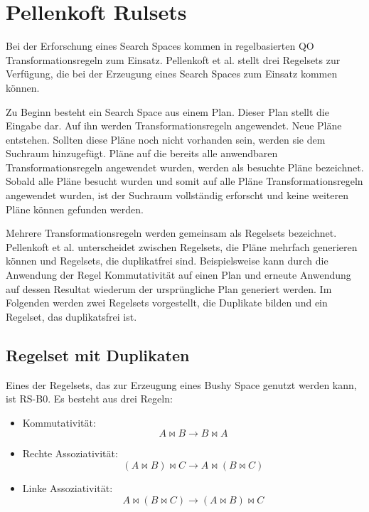 \section{Pellenkoft Rulsets}

Bei der Erforschung eines Search Spaces kommen in regelbasierten \ac{QO} Transformationsregeln zum Einsatz. Pellenkoft et al. \cite{pellenkoft1997duplicate} \cite{manegold2000multi} \cite{pellenkoft1997complexity} stellt drei Regelsets zur Verfügung, die bei der Erzeugung eines Search Spaces zum Einsatz kommen können.



Zu Beginn besteht ein Search Space aus einem Plan. Dieser Plan stellt die Eingabe dar. Auf ihn werden Transformationsregeln angewendet. Neue Pläne entstehen. Sollten diese Pläne noch nicht vorhanden sein, werden sie dem Suchraum hinzugefügt. Pläne auf die bereits alle anwendbaren Transformationsregeln angewendet wurden, werden als besuchte Pläne bezeichnet. Sobald alle Pläne besucht wurden und somit auf alle Pläne Transformationsregeln angewendet wurden, ist der Suchraum vollständig erforscht und keine weiteren Pläne können gefunden werden. 

Mehrere Transformationsregeln werden gemeinsam als Regelsets bezeichnet. Pellenkoft et al. unterscheidet zwischen Regelsets, die Pläne mehrfach generieren können und Regelsets, die duplikatfrei sind. Beispielsweise kann durch die Anwendung der Regel Kommutativität auf einen Plan und erneute Anwendung auf dessen Resultat wiederum der ursprüngliche Plan generiert werden. Im Folgenden werden zwei Regelsets vorgestellt, die Duplikate bilden und ein Regelset, das duplikatsfrei ist.


\subsection{Regelset mit Duplikaten}

Eines der Regelsets, das zur Erzeugung eines Bushy Space genutzt werden kann, ist RS-B0. Es besteht aus drei Regeln:

\begin{itemize}
\item Kommutativität: $$ A \Join B \to B \Join A$$
\item Rechte Assoziativität: $$(A \Join B) \Join C \to A \Join (B \Join C) $$
\item Linke Assoziativität: $$A \Join (B \Join C) \to (A \Join B) \Join C$$
\end{itemize}

